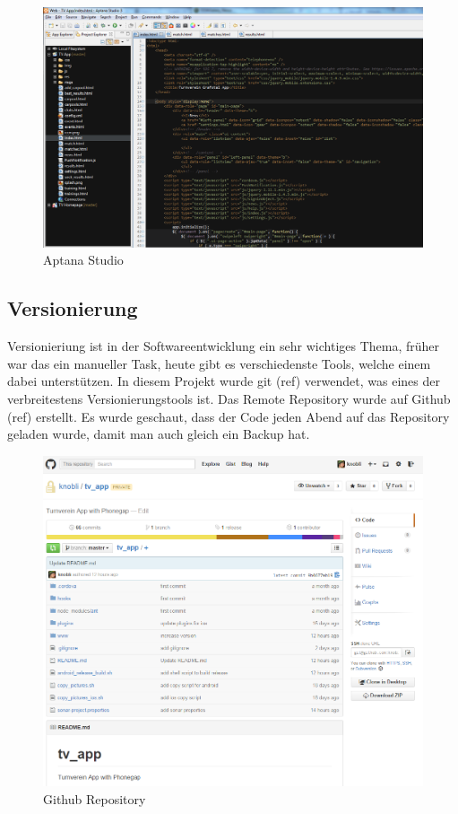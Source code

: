 \begin{figure}[h]
\centering
\includegraphics[scale=0.5]{images/aptana.png}
\caption{Aptana Studio}
\label{fig:aptana}
\end{figure}


\subsection{Versionierung}
Versionieriung ist in der Softwareentwicklung ein sehr wichtiges Thema, früher war das ein manueller Task, heute gibt es verschiedenste Tools, welche einem dabei unterstützen. In diesem Projekt wurde git (ref) verwendet, was eines der verbreitestens Versionierungstools ist. Das Remote Repository wurde auf Github (ref) erstellt. Es wurde geschaut, dass der Code jeden Abend auf das Repository geladen wurde, damit man auch gleich ein Backup hat.

\begin{figure}[h]
\centering
\includegraphics[scale=0.5]{images/github.png}
\caption{Github Repository}
\label{fig:github_repo}
\end{figure}


